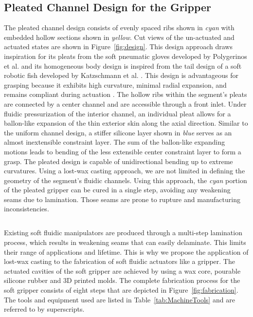 \subsection{Pleated Channel Design for the Gripper}
The pleated channel design consists of evenly spaced ribs shown in \emph{cyan} with embedded hollow sections shown in \emph{yellow}.
Cut views of the un-actuated and actuated states are shown in Figure~\ref{fig:design}.
This design approach draws inspiration for its pleats from the soft pneumatic gloves developed by Polygerinos et al. \cite{polygerinos2013towards} and its homogeneous body design is inspired from the tail design of a soft robotic fish developed by Katzschmann et al. \cite{katzschmann2014hydraulic}.
This design is advantageous for grasping because it exhibits high curvature, minimal radial expansion, and remains compliant during actuation \cite{marchese2015recipe}. 
The hollow ribs within the segment's pleats are connected by a center channel and are accessible through a front inlet.
Under fluidic pressurization of the interior channel, an individual pleat allows for a ballon-like expansion of the thin exterior skin along the axial direction.
Similar to the uniform channel design, a stiffer silicone layer shown in \emph{blue} serves as an almost inextensible constraint layer.
The sum of the ballon-like expanding motions leads to bending of the less extensible center constraint layer to form a grasp.
The pleated design is capable of unidirectional bending up to extreme curvatures.
Using a lost-wax casting approach, we are not limited in defining the geometry of the segment's fluidic channels.
Using this approach, the \emph{cyan} portion of the pleated gripper can be cured in a single step, avoiding any weakening seams due to lamination.
Those seams are prone to rupture and manufacturing inconsistencies.

\subsection{}
Existing soft fluidic manipulators are produced through a multi-step lamination process, which results in weakening seams that can easily delaminate. 
This limits their range of applications and lifetime.
This is why we propose the application of lost-wax casting to the fabrication of soft fluidic actuators like a gripper.
The actuated cavities of the soft gripper are achieved by using a wax core, pourable silicone rubber and 3D printed molds.
The complete fabrication process for the soft gripper consists of eight steps that are depicted in Figure~\ref{fig:fabrication}.
The tools and equipment used are listed in Table~\ref{tab:MachineTools} and are referred to by superscripts.

